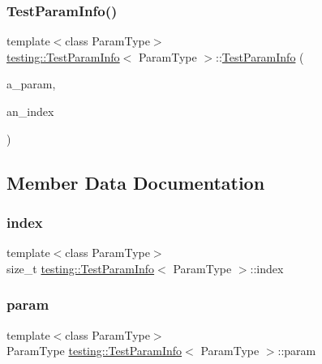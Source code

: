 \subsubsection{\texorpdfstring{TestParamInfo()}{TestParamInfo()}\hspace{0.1cm}{\footnotesize\ttfamily [3/3]}}
{\footnotesize\ttfamily template$<$class Param\+Type$>$ \\
\mbox{\hyperlink{structtesting_1_1_test_param_info}{testing\+::\+Test\+Param\+Info}}$<$ Param\+Type $>$\+::\mbox{\hyperlink{structtesting_1_1_test_param_info}{Test\+Param\+Info}} (\begin{DoxyParamCaption}\item[{const Param\+Type \&}]{a\+\_\+param,  }\item[{size\+\_\+t}]{an\+\_\+index }\end{DoxyParamCaption})\hspace{0.3cm}{\ttfamily [inline]}}



\subsection{Member Data Documentation}
\mbox{\label{structtesting_1_1_test_param_info_ad4d7bc02cbcc571eb3c1d2ec3ba5bb53}} 
\subsubsection{\texorpdfstring{index}{index}}
{\footnotesize\ttfamily template$<$class Param\+Type$>$ \\
size\+\_\+t \mbox{\hyperlink{structtesting_1_1_test_param_info}{testing\+::\+Test\+Param\+Info}}$<$ Param\+Type $>$\+::index}

\mbox{\label{structtesting_1_1_test_param_info_a146d921039f9da8b1336f7cc6e8436c2}} 
\subsubsection{\texorpdfstring{param}{param}}
{\footnotesize\ttfamily template$<$class Param\+Type$>$ \\
Param\+Type \mbox{\hyperlink{structtesting_1_1_test_param_info}{testing\+::\+Test\+Param\+Info}}$<$ Param\+Type $>$\+::param}



